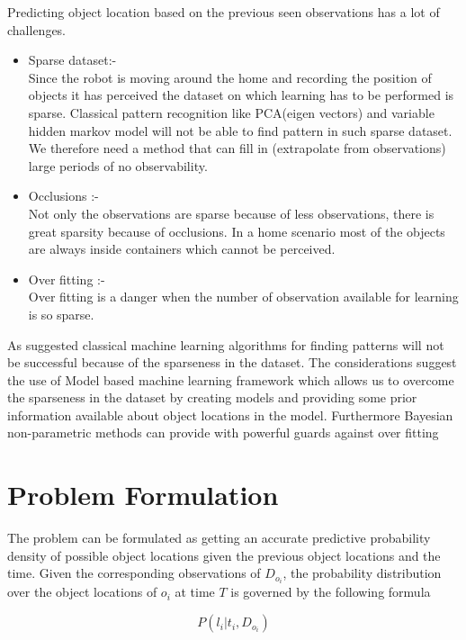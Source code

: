 \FloatBarrier
Predicting object location based on the previous seen observations has a lot of challenges. 
\begin{itemize}
	\item  Sparse dataset:-\\
Since the robot is moving around the home and recording the position of objects it has perceived the dataset on which learning has to be performed is sparse. Classical pattern recognition like PCA(eigen vectors)
and variable hidden markov model will not be able to find pattern in such
sparse dataset. We therefore need a method that can fill in (extrapolate from
observations) large periods of no observability.
    \item Occlusions :- \\
Not only the observations are sparse because of less observations, there is great
sparsity because of occlusions. In a home scenario most of the objects are
always inside containers which cannot be perceived.
    \item Over fitting :- \\
Over fitting is a danger when the number of observation available for learning
is so sparse.
\end{itemize}

As suggested classical machine learning algorithms for finding patterns will not be successful because of the sparseness in the dataset.
The considerations suggest the use of Model based machine learning framework   which allows us to overcome the sparseness in the dataset by creating models and providing some prior information available about object locations in the model.
Furthermore Bayesian non-parametric methods can provide with powerful guards
against over fitting

\section{Problem Formulation}
\label{sec:Problem formulation}

The problem can be formulated as getting an accurate predictive probability density of possible object locations given the previous object locations and the time. Given the corresponding observations of $D_{o_i}$, the probability distribution over the object locations of $o_i$ at time $T$ is governed by the following formula 

    \begin{equation} \label{eq:1}
	    P(l_i | t_i, D_{o_i})
    \end{equation}

